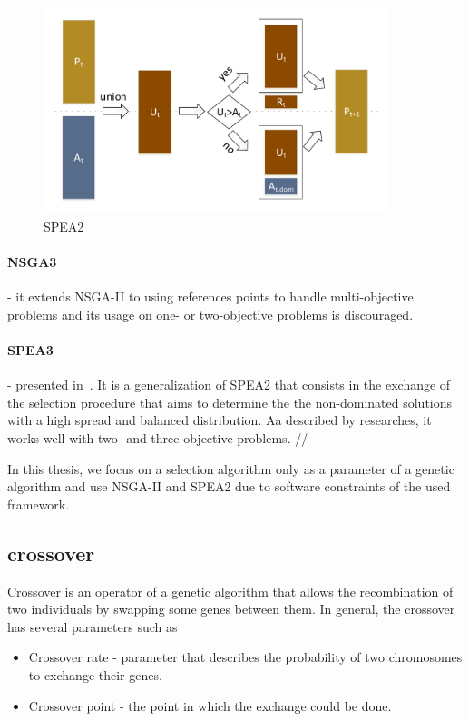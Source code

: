 	\begin{figure}
		\centering
		\includegraphics[width=0.9\textwidth]{images/spea2Selector.pdf}
		\caption[SPEA2]{SPEA2}
		\label{fig:spea2}
	\end{figure}
	
	\paragraph{NSGA3~\cite{deb14}} - it extends NSGA-II to using references points to handle multi-objective problems and its usage on one- or two-objective problems is discouraged.
	\paragraph{SPEA3} - presented in~\cite{rudzinski15}. It is a generalization of SPEA2 that consists in the exchange of the selection procedure that aims to determine the the non-dominated solutions with a high spread and balanced distribution. Aa described by researches, it works well with two- and three-objective problems. //

In this thesis, we focus on a selection algorithm only as a parameter of a genetic algorithm and use NSGA-II and SPEA2 due to software constraints of the used framework. 

\subsection{crossover}\label{sec:GeneticAlgorithmCrossover}

Crossover is an operator of a genetic algorithm that allows the recombination of two individuals by swapping some genes between them.
In general, the crossover has several parameters such as

\begin{itemize}
	\item Crossover rate - parameter that describes the probability of two chromosomes to exchange their genes.
	\item Crossover point - the point in which the exchange could be done.
\end{itemize}

